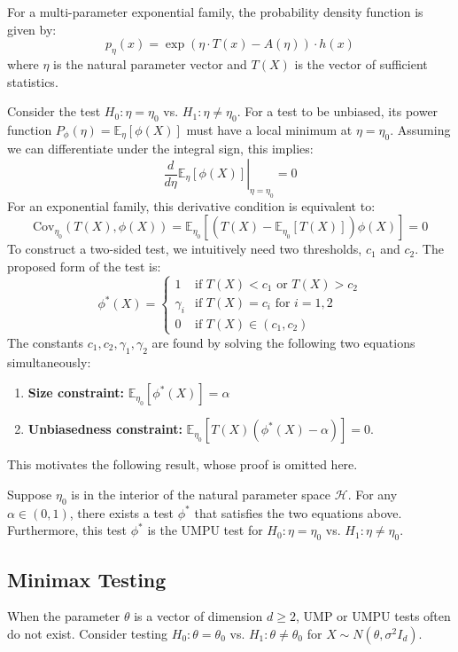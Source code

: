 For a multi-parameter exponential family, the probability density function is given by:
$$
p_{\eta}(x) = \exp(\eta \cdot T(x) - A(\eta)) \cdot h(x)
$$
where $\eta$ is the natural parameter vector and $T(X)$ is the vector of sufficient statistics.
\begin{eg}
    Consider the test $H_0: \eta = \eta_0$ vs. $H_1: \eta \neq \eta_0$. For a test to be unbiased, its power function $P_{\phi}(\eta) = \mathbb{E}_{\eta}[\phi(X)]$ must have a local minimum at $\eta = \eta_0$. Assuming we can differentiate under the integral sign, this implies:
$$
\left. \frac{d}{d\eta} \mathbb{E}_{\eta}[\phi(X)] \right|_{\eta=\eta_0} = 0
$$
For an exponential family, this derivative condition is equivalent to:
$$
\text{Cov}_{\eta_0}(T(X), \phi(X)) = \mathbb{E}_{\eta_0}\left[ (T(X) - \mathbb{E}_{\eta_0}[T(X)])\phi(X) \right] = 0
$$
To construct a two-sided test, we intuitively need two thresholds, $c_1$ and $c_2$. The proposed form of the test is:
$$
\phi^*(X) = 
\begin{cases} 
1 & \text{if } T(X) < c_1 \text{ or } T(X) > c_2 \\
\gamma_i & \text{if } T(X) = c_i \text{ for } i=1,2 \\
0 & \text{if } T(X) \in (c_1, c_2)
\end{cases}
$$
The constants $c_1, c_2, \gamma_1, \gamma_2$ are found by solving the following two equations simultaneously:
\begin{enumerate}
    \item \textbf{Size constraint:} $\mathbb{E}_{\eta_0}[\phi^*(X)] = \alpha$
    \item \textbf{Unbiasedness constraint:} $\mathbb{E}_{\eta_0}[T(X)(\phi^*(X) - \alpha)] = 0$.
\end{enumerate}
This motivates the following result, whose proof is omitted here.
\end{eg}


\begin{thm}
Suppose $\eta_0$ is in the interior of the natural parameter space $\mathcal{H}$. For any $\alpha \in (0,1)$, there exists a test $\phi^*$ that satisfies the two equations above. Furthermore, this test $\phi^*$ is the UMPU test for $H_0: \eta = \eta_0$ vs. $H_1: \eta \neq \eta_0$. 
\end{thm}

\subsection{Minimax Testing}
When the parameter $\theta$ is a vector of dimension $d \ge 2$, UMP or UMPU tests often do not exist. Consider testing $H_0: \theta = \theta_0$ vs. $H_1: \theta \neq \theta_0$ for $X \sim N(\theta, \sigma^2 I_d)$.

